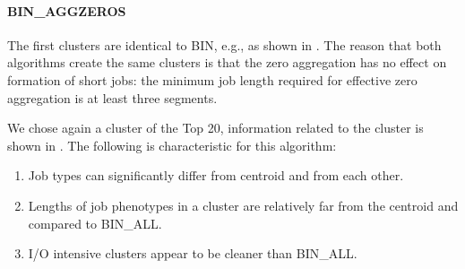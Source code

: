 \documentclass{jhps}
\begin{document}
\FloatBarrier
\paragraph{BIN\_AGGZEROS}
The first clusters are identical to BIN, e.g., as shown in .
The reason that both algorithms create the same clusters is that the zero aggregation has no effect on formation of short jobs: the minimum job length required for effective zero aggregation is at least three segments.

We chose again a cluster of the Top 20, information related to the cluster is shown in .
The following is characteristic for this algorithm:

\begin{enumerate}
 \item Job types can significantly differ from centroid and from each other.
 \item Lengths of job phenotypes in a cluster are relatively far from the centroid and compared to BIN\_ALL.
 \item I/O intensive clusters appear to be cleaner than BIN\_ALL.
\end{enumerate}
\end{document}

